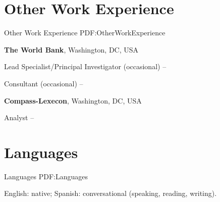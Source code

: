 \documentclass[letterpaper,10pt,oneside]{article}
\begin{document}
\begin{body}

\section
{Other Work\newline
Experience}
{Other Work Experience}
{PDF:OtherWorkExperience}


\textbf{The World Bank},
Washington, DC, USA
\par
Lead Specialist/Principal Investigator (occasional)
\hfill
{} -- 

\smallskip


\par
Consultant (occasional)
\hfill
{} -- 

\smallskip

\textbf{Compass-Lexecon},
Washington, DC, USA
\par
Analyst
\hfill
{} --



\section
{Languages}
{Languages}
{PDF:Languages}

English: native; Spanish: conversational (speaking, reading, writing).

\newpage 


\end{body}

\label{LastPage}~
\end{document}
